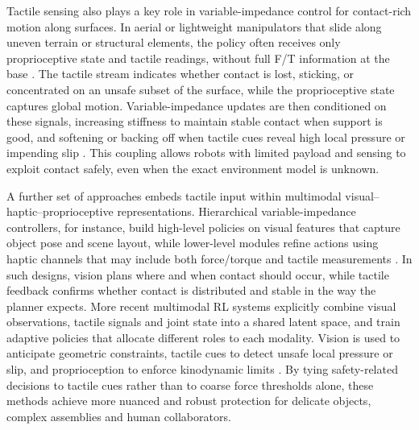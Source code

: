 \documentclass[Afour,sageh,times]{template/sagej}
\newcommand{\suggest}[1]{{\color{olive} (#1)}}
\begin{document}
Tactile sensing also plays a key role in variable-impedance control for contact-rich motion along surfaces. In aerial or lightweight manipulators that slide along uneven terrain or structural elements, the policy often receives only proprioceptive state and tactile readings, without full F/T information at the base \cite{71}. The tactile stream indicates whether contact is lost, sticking, or concentrated on an unsafe subset of the surface, while the proprioceptive state captures global motion. Variable-impedance updates are then conditioned on these signals, increasing stiffness to maintain stable contact when support is good, and softening or backing off when tactile cues reveal high local pressure or impending slip \cite{71}. This coupling allows robots with limited payload and sensing to exploit contact safely, even when the exact environment model is unknown.

A further set of approaches embeds tactile input within multimodal visual–haptic–proprioceptive representations. Hierarchical variable-impedance controllers, for instance, build high-level policies on visual features that capture object pose and scene layout, while lower-level modules refine actions using haptic channels that may include both force/torque and tactile measurements \cite{31}. In such designs, vision plans where and when contact should occur, while tactile feedback confirms whether contact is distributed and stable in the way the planner expects. More recent multimodal RL systems explicitly combine visual observations, tactile signals and joint state into a shared latent space, and train adaptive policies that allocate different roles to each modality. Vision is used to anticipate geometric constraints, tactile cues to detect unsafe local pressure or slip, and proprioception to enforce kinodynamic limits \cite{86}. By tying safety-related decisions to tactile cues rather than to coarse force thresholds alone, these methods achieve more nuanced and robust protection for delicate objects, complex assemblies and human collaborators.


\end{document}
